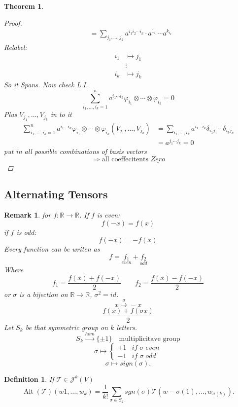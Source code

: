\documentclass[12pt]{article}
\def\mat{\mathcal{T}}
\def\RR{\mathbb{R}}
\DeclareMathOperator{\alt}{Alt}
\newtheorem{theorem}{Theorem}[section]
\newtheorem{definition}{Definition}[section]
\newtheorem*{remark}{Remark}
\begin{document}
\begin{theorem}
\begin{proof}
\begin{align*}
&=\sum\limits_{j_1, \dots, j_k}a^{i_1i_2\cdots i_k}\cdot a^{1_{i_1}}\cdots a^{k_{i_k}} \end{align*}
Relabel: \begin{align*} i_1 &\mapsto j_1 \\ &\vdots \\ i_k &\mapsto j_k \end{align*}
So it Spans. Now check L.I.
\[ \sum\limits_{i_1,\dots , i_k=1}^{n}a^{i_1\cdots i_k}\varphi_{i_1}\otimes\cdots\otimes\varphi_{i_k} =0\]
Plus $V_{j_1}, \dots , V_{j_k}$ in to it
\begin{align*} \sum\limits_{i_1,\dots , i_k=1}^{n}a^{i_1\cdots i_k}\varphi_{i_1}\otimes\cdots\otimes\varphi_{i_k}(V_{j_1}, \dots , V_{j_k})  &= \sum\limits_{i_1,\dots , i_k}a^{i_1\cdots i_k}\delta_{i_1 j_1}\cdots\delta_{i_k j_k}\\
&= a^{j_1\cdots j_k} = 0 \end{align*}
put in all possible combinations of basis vectors 
\[\Rightarrow \text{all coeffecitents }\underline{Zero}\]
\end{proof}
\end{theorem}

\subsection{Alternating Tensors}

\begin{remark}
for $f:\RR \rightarrow \RR$. If $f$ is even:
\[f(-x) = f(x)\]
if $f$ is odd:
\[f(-x) = -f(x)\]
Every function can be writen as
\[f = \underset{even}{f_1} + \underset{odd}{f_2}\]
Where
\[f_1 = \frac{f(x) + f(-x)}{2} \qquad f_2=\frac{f(x) - f(-x)}{2}\]
or $\sigma$ is a bijection on $\RR \rightarrow \RR$, $\sigma^2 = id$.
\[x \overset{\sigma}{\mapsto} -x\]
\[\frac{f(x) +  f(\sigma x)}{2}\]
Let $S_k$ be that symmetric group on $k$ letters.
\[S_k \overset{hom}{\rightarrow}\{\pm 1\} \quad \text{multiplicitave group}\]
\[ \sigma \mapsto \begin{cases} +1 & if \; \sigma \; even \\
-1 & if \; \sigma \; odd \end{cases}\]
\[\sigma \mapsto sign(\sigma).\]
\end{remark}

\begin{definition}
If $\mathcal{T} \in \mathcal{J}^k(V)$
\[\alt(\mathcal{T})(w1, \dots , w_k) = \frac{1}{k!}\sum\limits_{\sigma \in S_k} sgn(\sigma)\mat(w-{\sigma(1)}, \dots , w_{\sigma(k)}).\]
\end{definition}
\end{document}

